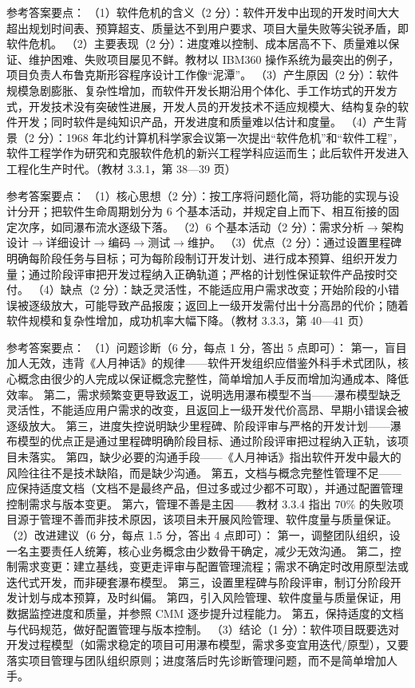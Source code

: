 \documentclass[a4paper,11pt]{article}
\begin{document}
\q 参考答案要点：
（1）软件危机的含义（2 分）：软件开发中出现的开发时间大大超出规划时间表、预算超支、质量达不到用户要求、项目大量失败等尖锐矛盾，即软件危机。
（2）主要表现（2 分）：进度难以控制、成本居高不下、质量难以保证、维护困难、失败项目屡见不鲜。教材以 IBM360 操作系统为最突出的例子，项目负责人布鲁克斯形容程序设计工作像“泥潭”。
（3）产生原因（2 分）：软件规模急剧膨胀、复杂性增加，而软件开发长期沿用个体化、手工作坊式的开发方式，开发技术没有突破性进展，开发人员的开发技术不适应规模大、结构复杂的软件开发；同时软件是纯知识产品，开发进度和质量难以估计和度量。
（4）产生背景（2 分）：1968 年北约计算机科学家会议第一次提出“软件危机”和“软件工程”，软件工程学作为研究和克服软件危机的新兴工程学科应运而生；此后软件开发进入工程化生产时代。（教材 3.3.1，第 38—39 页）

\q 参考答案要点：
（1）核心思想（2 分）：按工序将问题化简，将功能的实现与设计分开；把软件生命周期划分为 6 个基本活动，并规定自上而下、相互衔接的固定次序，如同瀑布流水逐级下落。
（2）6 个基本活动（2 分）：需求分析$\rightarrow$架构设计$\rightarrow$详细设计$\rightarrow$编码$\rightarrow$测试$\rightarrow$维护。
（3）优点（2 分）：通过设置里程碑明确每阶段任务与目标；可为每阶段制订开发计划、进行成本预算、组织开发力量；通过阶段评审把开发过程纳入正确轨道；严格的计划性保证软件产品按时交付。
（4）缺点（2 分）：缺乏灵活性，不能适应用户需求改变；开始阶段的小错误被逐级放大，可能导致产品报废；返回上一级开发需付出十分高昂的代价；随着软件规模和复杂性增加，成功机率大幅下降。（教材 3.3.3，第 40—41 页）


\q 参考答案要点：
（1）问题诊断（6 分，每点 1 分，答出 5 点即可）：
第一，盲目加人无效，违背《人月神话》的规律——软件开发组织应借鉴外科手术式团队，核心概念由很少的人完成以保证概念完整性，简单增加人手反而增加沟通成本、降低效率。
第二，需求频繁变更导致返工，说明选用瀑布模型不当——瀑布模型缺乏灵活性，不能适应用户需求的改变，且返回上一级开发代价高昂、早期小错误会被逐级放大。
第三，进度失控说明缺少里程碑、阶段评审与严格的开发计划——瀑布模型的优点正是通过里程碑明确阶段目标、通过阶段评审把过程纳入正轨，该项目未落实。
第四，缺少必要的沟通手段——《人月神话》指出软件开发中最大的风险往往不是技术缺陷，而是缺少沟通。
第五，文档与概念完整性管理不足——应保持适度文档（文档不是最终产品，但过多或过少都不可取），并通过配置管理控制需求与版本变更。
第六，管理不善是主因——教材 3.3.4 指出 70\% 的失败项目源于管理不善而非技术原因，该项目未开展风险管理、软件度量与质量保证。
（2）改进建议（6 分，每点 1.5 分，答出 4 点即可）：
第一，调整团队组织，设一名主要责任人统筹，核心业务概念由少数骨干确定，减少无效沟通。
第二，控制需求变更：建立基线，变更走评审与配置管理流程；需求不确定时改用原型法或迭代式开发，而非硬套瀑布模型。
第三，设置里程碑与阶段评审，制订分阶段开发计划与成本预算，及时纠偏。
第四，引入风险管理、软件度量与质量保证，用数据监控进度和质量，并参照 CMM 逐步提升过程能力。
第五，保持适度的文档与代码规范，做好配置管理与版本控制。
（3）结论（1 分）：软件项目既要选对开发过程模型（如需求稳定的项目可用瀑布模型，需求多变宜用迭代/原型），又要落实项目管理与团队组织原则；进度落后时先诊断管理问题，而不是简单增加人手。
\end{document}
